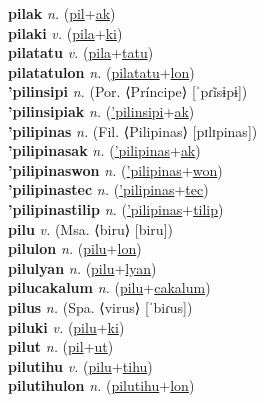 \textbf{pilak} \textit{n.} (\hyperref[pil]{pil}+\hyperref[ak]{ak})
 \label{pilak} \\
\textbf{pilaki} \textit{v.} (\hyperref[pila]{pila}+\hyperref[ki]{ki})
 \label{pilaki} \\
\textbf{pilatatu} \textit{v.} (\hyperref[pila]{pila}+\hyperref[tatu]{tatu})
 \label{pilatatu} \\
\textbf{pilatatulon} \textit{n.} (\hyperref[pilatatu]{pilatatu}+\hyperref[lon]{lon})
 \label{pilatatulon} \\
\textbf{'pilinsipi} \textit{n.} (Por. ⟨Príncipe⟩ [ˈpɾĩsɨpɨ])
 \label{'pilinsipi} \\
\textbf{'pilinsipiak} \textit{n.} (\hyperref['pilinsipi]{'pilinsipi}+\hyperref[ak]{ak})
 \label{'pilinsipiak} \\
\textbf{'pilipinas} \textit{n.} (Fil. ⟨Pilipinas⟩ [pɪlɪpinas])
 \label{'pilipinas} \\
\textbf{'pilipinasak} \textit{n.} (\hyperref['pilipinas]{'pilipinas}+\hyperref[ak]{ak})
 \label{'pilipinasak} \\
\textbf{'pilipinaswon} \textit{n.} (\hyperref['pilipinas]{'pilipinas}+\hyperref[won]{won})
 \label{'pilipinaswon} \\
\textbf{'pilipinastec} \textit{n.} (\hyperref['pilipinas]{'pilipinas}+\hyperref[tec]{tec})
 \label{'pilipinastec} \\
\textbf{'pilipinastilip} \textit{n.} (\hyperref['pilipinas]{'pilipinas}+\hyperref[tilip]{tilip})
 \label{'pilipinastilip} \\
\textbf{pilu} \textit{v.} (Msa. ⟨biru⟩ [biru])
 \label{pilu} \\
\textbf{pilulon} \textit{n.} (\hyperref[pilu]{pilu}+\hyperref[lon]{lon})
 \label{pilulon} \\
\textbf{pilulyan} \textit{n.} (\hyperref[pilu]{pilu}+\hyperref[lyan]{lyan})
 \label{pilulyan} \\
\textbf{pilucakalum} \textit{n.} (\hyperref[pilu]{pilu}+\hyperref[cakalum]{cakalum})
 \label{pilucakalum} \\
\textbf{pilus} \textit{n.} (Spa. ⟨virus⟩ [ˈbiɾus])
 \label{pilus} \\
\textbf{piluki} \textit{v.} (\hyperref[pilu]{pilu}+\hyperref[ki]{ki})
 \label{piluki} \\
\textbf{pilut} \textit{n.} (\hyperref[pil]{pil}+\hyperref[ut]{ut})
 \label{pilut} \\
\textbf{pilutihu} \textit{v.} (\hyperref[pilu]{pilu}+\hyperref[tihu]{tihu})
 \label{pilutihu} \\
\textbf{pilutihulon} \textit{n.} (\hyperref[pilutihu]{pilutihu}+\hyperref[lon]{lon})
